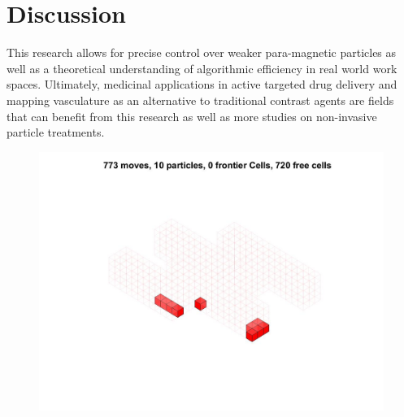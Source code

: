 \documentclass[letterpaper, 9 pt, conference]{ieeeconf}  %
\begin{document}
\section{Discussion}\label{sec:Discussion}
	This research allows for precise control over weaker para-magnetic particles as well as a theoretical understanding of algorithmic efficiency in real world work spaces. Ultimately, medicinal applications in active targeted drug delivery and mapping vasculature as an alternative to traditional contrast agents are fields that can benefit from this research as well as more studies on non-invasive particle treatments. 
\begin{figure}

	\includegraphics[height=0.2\paperheight]{10particles_3D.jpg}

\end{figure}
\end{document}
